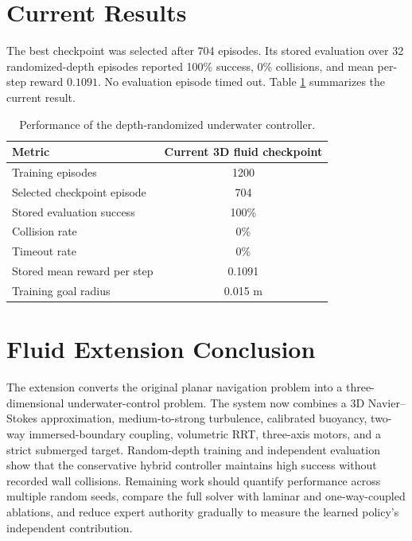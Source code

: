 \documentclass[12pt]{article}
\begin{document}
\section{Current Results}

The best checkpoint was selected after 704 episodes.  Its stored evaluation over
32 randomized-depth episodes reported 100\% success, 0\% collisions, and mean
per-step reward \(0.1091\).  No evaluation episode timed out.  Table
\ref{tab:fluid_checkpoint} summarizes the current result.

\begin{table}[H]
    \centering
    \begin{tabular}{lc}
        \hline
        \textbf{Metric} & \textbf{Current 3D fluid checkpoint} \\
        \hline
        Training episodes & 1200 \\
        Selected checkpoint episode & 704 \\
        Stored evaluation success & 100\% \\
        Collision rate & 0\% \\
        Timeout rate & 0\% \\
        Stored mean reward per step & 0.1091 \\
        Training goal radius & 0.015 m \\
        \hline
    \end{tabular}
    \caption{Performance of the depth-randomized underwater controller.}
    \label{tab:fluid_checkpoint}
\end{table}

\section{Fluid Extension Conclusion}

The extension converts the original planar navigation problem into a
three-dimensional underwater-control problem.  The system now combines a 3D
Navier--Stokes approximation, medium-to-strong turbulence, calibrated buoyancy,
two-way immersed-boundary coupling, volumetric RRT, three-axis motors, and a
strict submerged target.  Random-depth training and independent evaluation
show that the conservative hybrid controller maintains high success without
recorded wall collisions.  Remaining work should quantify performance across
multiple random seeds, compare the full solver with laminar and one-way-coupled
ablations, and reduce expert authority gradually to measure the learned policy's
independent contribution.
\end{document}
